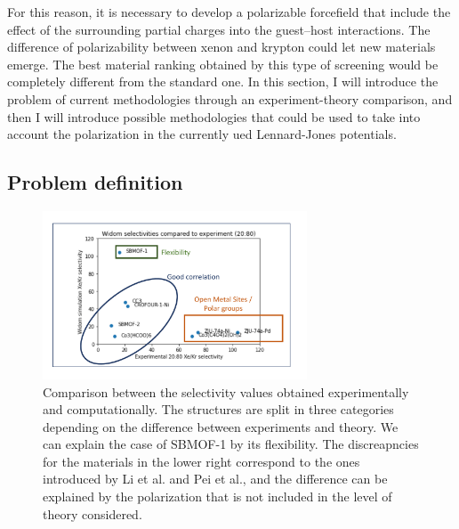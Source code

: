 \documentclass[main]{subfiles}
\begin{document}
For this reason, it is necessary to develop a polarizable forcefield that include the effect of the surrounding partial charges into the guest--host interactions. The difference of polarizability between xenon and krypton could let new materials emerge. The best material ranking obtained by this type of screening would be completely different from the standard one. In this section, I will introduce the problem of current methodologies through an experiment-theory comparison, and then I will introduce possible methodologies that could be used to take into account the polarization in the currently ued Lennard-Jones potentials.

\subsection{Problem definition}

\begin{figure}[ht]
  \centering
  \includegraphics[width=0.7\textwidth]{figures/6-perspectives/exp_theory_discrepancies.pdf}
  \caption{ Comparison between the selectivity values obtained experimentally and computationally. The structures are split in three categories depending on the difference between experiments and theory. We can explain the case of SBMOF-1 by its flexibility. The discreapncies for the materials in the lower right correspond to the ones introduced by Li et al. and Pei et al.,\autocite{Li_2019,Pei_2022} and the difference can be explained by the polarization that is not included in the level of theory considered.  }\label{fgr:exp_theory_discrepancy}
\end{figure}
\end{document}
